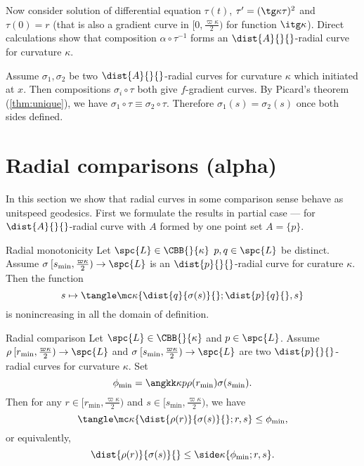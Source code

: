 Now consider solution of differential equation $\tau(t)$, $\tau'=(\tg\kappa\tau)^2$ and $\tau(0)=r$ 
(that is also a gradient curve in $[0,\tfrac{\varpi\kappa}2)$ for function $\itg\kappa$).
Direct calculations show that composition $\alpha\circ\tau^{-1}$ 
forms an $\dist{A}{}{}$-radial curve for curvature $\kappa$.

 Assume $\sigma_1,\sigma_2$ be two $\dist{A}{}{}$-radial curves for curvature $\kappa$ which initiated at $x$.
Then compositions $\sigma_i\circ\tau$ both give $f$-gradient curves.
By Picard's theorem (\ref{thm:unique}), we have
$\sigma_1\circ\tau 
\equiv 
\sigma_2\circ\tau$.
Therefore $\sigma_1(s)=\sigma_2(s)$ once both sides defined.
\qeds










\section{Radial comparisons (alpha)}\label{sec:rad-curv}

In this section we show that radial curves in some comparison sense behave as unitspeed geodesics.
First we formulate the results in partial case --- for $\dist{A}{}{}$-radial curve with $A$ formed by one point set $A=\{p\}$.

\begin{thm}{Radial monotonicity}\label{rad-mon}
Let $\spc{L}\in\CBB{}{\kappa}$ 
$p, q\in \spc{L}$ be distinct.
Assume $\sigma\:  [s_{\min},\tfrac{\varpi\kappa}2)\to \spc{L}$
is an $\dist{p}{}{}$-radial curve for curature $\kappa$.
Then the function 
$$s\mapsto 
\tangle\mc\kappa\{
\dist{q}{\sigma(s)}{};
\dist{p}{q}{},
s
\}$$
is nonincreasing in all the domain of definition.
\end{thm}

\begin{thm}{Radial comparison}\label{rad-comp}
Let $\spc{L}\in\CBB{}{\kappa}$ 
and $p\in \spc{L}$.
Assume $\rho\:  [r_{\min},\tfrac{\varpi\kappa}2)\to \spc{L}$
and    $\sigma\:[s_{\min},\tfrac{\varpi\kappa}2)\to \spc{L}$
are two $\dist{p}{}{}$-radial curves for curvature $\kappa$.
Set
$$\phi_{\min}=\angkk\kappa p{\rho(r_{\min})}{\sigma(s_{\min})}.
$$
Then for any $r\in[r_{\min},\tfrac{\varpi\kappa}2)$ and  $s\in[s_{\min},\tfrac{\varpi\kappa}2)$,
we have
$$
\tangle\mc\kappa\{\dist{\rho(r)}{\sigma(s)}{};r,s\}
\le \phi_{\min},
$$
or equivalently,
$$
\dist{\rho(r)}{\sigma(s)}{}
\le \side\kappa\{\phi_{\min};r,s\}.
$$

\end{thm}

